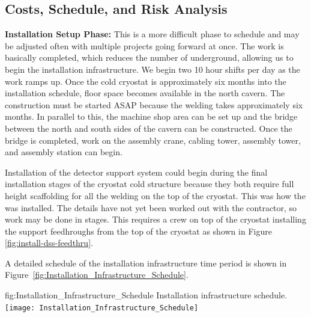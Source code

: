 \subsection{Costs, Schedule, and Risk Analysis}
\label{sec:fdsp-tc-infr-cost}


{\bf Installation Setup Phase:} This is a more difficult phase to schedule and may be adjusted often with multiple projects going forward at once. The  work is basically completed, which reduces the number of  underground, allowing us to begin the installation infrastructure. We begin two 10 hour shifts per day as the work ramps up.  Once the cold cryostat is approximately six months into the installation schedule, floor space becomes available in the north cavern. The \coldbox construction must be started ASAP because the welding takes approximately six months. In parallel to this, the machine shop area can be set up and the bridge between the north and south sides of the cavern can be constructed.  Once the bridge is completed, work on the assembly crane,  cabling tower,  assembly tower, and  assembly station can begin. 
    
Installation of the detector support system could begin during the final installation stages of the cryostat cold structure because they both require full height scaffolding for all the welding on the top of the cryostat. This was how the   was installed. The details have not yet been worked out with the contractor, so work may be done in stages. This requires a crew on top of the cryostat installing the  support feedhroughs from the top of the cryostat as shown in Figure \ref{fig:install-dss-feedthru}. 

A detailed schedule of the installation infrastructure time period is shown in Figure~\ref{fig:Installation_Infrastructure_Schedule}.
    
\begin{dunefigure}
{fig:Installation_Infrastructure_Schedule}
    {Installation infrastructure schedule.}
\texttt{[image: Installation\_Infrastructure\_Schedule]} 
\end{dunefigure}


\clearpage
